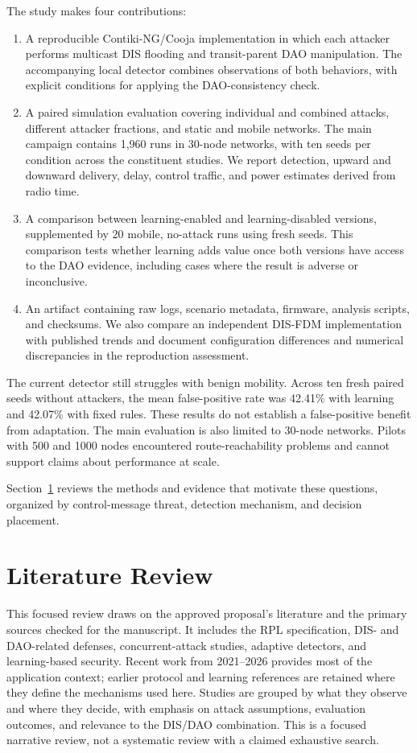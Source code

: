 \documentclass[journal]{IEEEtran}
\begin{document}
The study makes four contributions:
\begin{enumerate}
\item A reproducible Contiki-NG/Cooja implementation in which each attacker performs multicast DIS flooding and transit-parent DAO manipulation. The accompanying local detector combines observations of both behaviors, with explicit conditions for applying the DAO-consistency check.
\item A paired simulation evaluation covering individual and combined attacks, different attacker fractions, and static and mobile networks. The main campaign contains 1,960 runs in 30-node networks, with ten seeds per condition across the constituent studies. We report detection, upward and downward delivery, delay, control traffic, and power estimates derived from radio time.
\item A comparison between learning-enabled and learning-disabled versions, supplemented by 20 mobile, no-attack runs using fresh seeds. This comparison tests whether learning adds value once both versions have access to the DAO evidence, including cases where the result is adverse or inconclusive.
\item An artifact containing raw logs, scenario metadata, firmware, analysis scripts, and checksums. We also compare an independent DIS-FDM implementation with published trends and document configuration differences and numerical discrepancies in the reproduction assessment.
\end{enumerate}

The current detector still struggles with benign mobility. Across ten fresh paired seeds without attackers, the mean false-positive rate was 42.41\% with learning and 42.07\% with fixed rules. These results do not establish a false-positive benefit from adaptation. The main evaluation is also limited to 30-node networks. Pilots with 500 and 1000 nodes encountered route-reachability problems and cannot support claims about performance at scale.

Section~\ref{sec:related} reviews the methods and evidence that motivate these questions, organized by control-message threat, detection mechanism, and decision placement.

\section{Literature Review}\label{sec:related}
This focused review draws on the approved proposal's literature and the primary sources checked for the manuscript. It includes the RPL specification, DIS- and DAO-related defenses, concurrent-attack studies, adaptive detectors, and learning-based security. Recent work from 2021--2026 provides most of the application context; earlier protocol and learning references are retained where they define the mechanisms used here. Studies are grouped by what they observe and where they decide, with emphasis on attack assumptions, evaluation outcomes, and relevance to the DIS/DAO combination. This is a focused narrative review, not a systematic review with a claimed exhaustive search.
\end{document}
